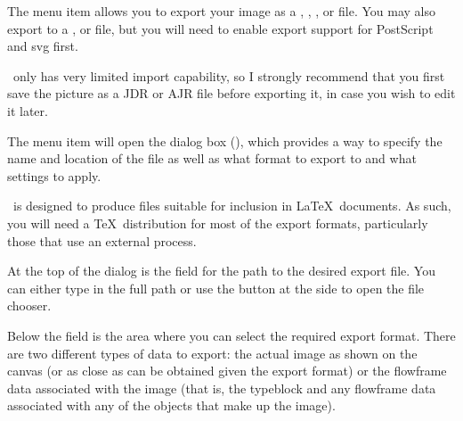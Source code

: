 The  menu item allows you to export your image
as a , ,
,  or
 file. You may also export to a
,  or 
 file, but you will need to enable export support for
PostScript and \gls{svg} first.

\begin{warning}
\FlowframTk\ only has very limited import capability, so I
strongly recommend that you first save the picture as a
\gls{JDR} or \gls{AJR} file before exporting it, in case you
wish to edit it later.
\end{warning}

The  menu item will open the  dialog box
(), which provides a way to
specify the name and location of the file as well as what format to
export to and what settings to apply. 

\begin{information}
\FlowframTk\ is designed to produce files suitable for inclusion in
\LaTeX\ documents. As such, you will need a \TeX\ distribution for
most of the export formats, particularly those that use an external
process.
\end{information}


At the top of the  dialog is the
 field for the path to
the desired export file. You can either type in the full path or use
the  button at the side to open the file chooser.


Below the  field is the  area where you
can select the required export format.
There are two different types of data to export: the actual image as
shown on the \gls{canvas} (or as close as can be obtained given the
export format) or the \gls{flowframe} data associated with the
image (that is, the \gls{typeblock} and any \gls{flowframe} data
associated with any of the \glspl{object} that make up the image).


